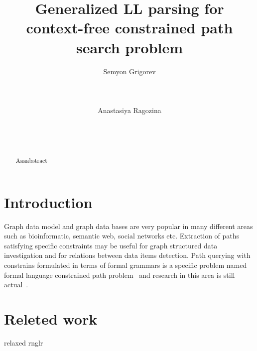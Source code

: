 \documentclass{sig-alternate} %
\begin{document}
\makeatletter
\def\@copyrightspace{\relax}
\makeatother

\title{Generalized LL parsing for context-free constrained path search problem}

\sloppy


\author{
\alignauthor
       Semyon Grigorev\\
       \\
       \\
       \\
\alignauthor
       Anastasiya Ragozina\\
       \\
       \\
       \\
}

\maketitle

\begin{abstract}
Aaaabstract

\end{abstract}

\section{Introduction}
Graph data model and graph data bases are very popular in many different areas such as bioinformatic, semantic web, social networks etc.
Extraction of paths satisfying specific constraints may be useful for graph structured data investigation and for relations between data items detection.
Path querying with constrains formulated in terms of formal grammars is a specific problem named formal language constrained path problem~\cite{FLCpathProblem} and research in this area is still actual~\cite{DirOfBigGraphAnalysis}.

\section{Releted work}

relaxed rnglr~\cite{relaxedRNGLR}
\end{document}
